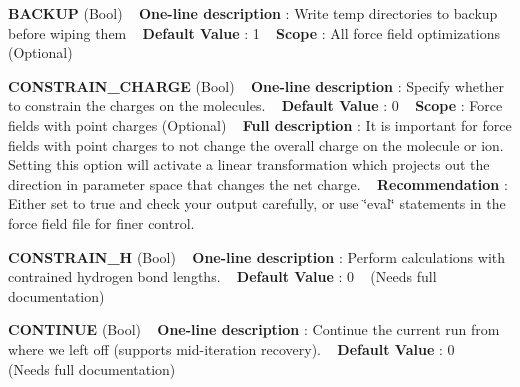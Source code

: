 \begin{DoxyItemize}
\item {\bfseries  B\+A\+C\+K\+UP } (Bool) ~\newline
{\bfseries  One-\/line description }\+: Write temp directories to backup before wiping them ~\newline
{\bfseries  Default Value }\+: 1 ~\newline
{\bfseries  Scope }\+: All force field optimizations (Optional)\end{DoxyItemize}
\begin{DoxyItemize}
\item {\bfseries  C\+O\+N\+S\+T\+R\+A\+I\+N\+\_\+\+C\+H\+A\+R\+GE } (Bool) ~\newline
{\bfseries  One-\/line description }\+: Specify whether to constrain the charges on the molecules. ~\newline
{\bfseries  Default Value }\+: 0 ~\newline
{\bfseries  Scope }\+: Force fields with point charges (Optional) ~\newline
{\bfseries  Full description }\+: It is important for force fields with point charges to not change the overall charge on the molecule or ion. Setting this option will activate a linear transformation which projects out the direction in parameter space that changes the net charge. ~\newline
{\bfseries  Recommendation }\+: Either set to true and check your output carefully, or use \char`\"{}eval\char`\"{} statements in the force field file for finer control.\end{DoxyItemize}
\begin{DoxyItemize}
\item {\bfseries  C\+O\+N\+S\+T\+R\+A\+I\+N\+\_\+H } (Bool) ~\newline
{\bfseries  One-\/line description }\+: Perform calculations with contrained hydrogen bond lengths. ~\newline
{\bfseries  Default Value }\+: 0 ~\newline
(Needs full documentation)\end{DoxyItemize}
\begin{DoxyItemize}
\item {\bfseries  C\+O\+N\+T\+I\+N\+UE } (Bool) ~\newline
{\bfseries  One-\/line description }\+: Continue the current run from where we left off (supports mid-\/iteration recovery). ~\newline
{\bfseries  Default Value }\+: 0 ~\newline
(Needs full documentation)\end{DoxyItemize}
